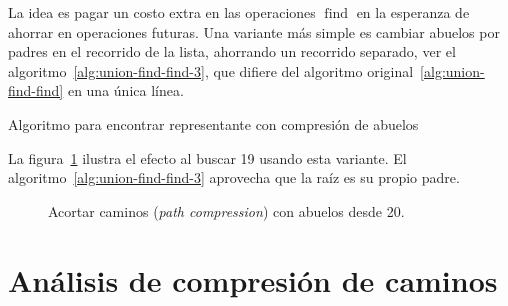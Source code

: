   La idea es pagar un costo extra en las operaciones \(\operatorname{find}\)
  en la esperanza de ahorrar en operaciones futuras.
  Una variante más simple es cambiar abuelos por padres
  en el recorrido de la lista,
  ahorrando un recorrido separado,
  ver el algoritmo~\ref{alg:union-find-find-3},
  que difiere del algoritmo original~\ref{alg:union-find-find}
  en una única línea.
  \begin{algorithm}[ht]
    \DontPrintSemicolon\Indp

    \caption{Algoritmo para encontrar representante con compresión de abuelos}
    \label{alg:union-find-find-3}
  \end{algorithm}
  La figura~\ref{fig:union-find-path-compression-grandparent}
  ilustra el efecto al buscar \num{19} usando esta variante.
  El algoritmo~\ref{alg:union-find-find-3}
  aprovecha que la raíz es su propio padre.
  \begin{figure}[ht]
    \centering
    \caption{Acortar caminos
             (\emph{\foreignlanguage{english}{path compression}})
             con abuelos desde \num{20}.}
    \label{fig:union-find-path-compression-grandparent}
  \end{figure}

\section{Análisis de compresión de caminos}
\label{sec:union-find-analysis-path-compression}

